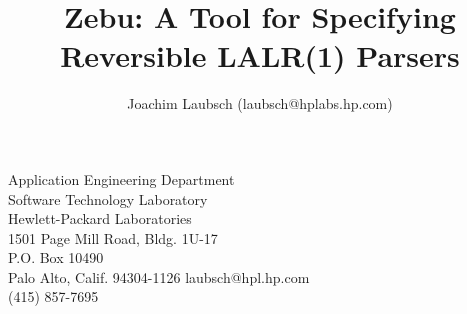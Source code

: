 %


\makeindex


\newcommand{\alt}[0]{$\dot{|}\: $}
\newcommand{\metavar}[1]{\mbox{$\langle\/$#1$\/\rangle$}}
\newcommand{\metavm}[1]{\mbox{\em $\langle\/$#1$\/\rangle$}}

\topmargin 0in
\textheight 8.5in
\oddsidemargin 0.2in
\evensidemargin 0.2in
\textwidth 6.0in
\parskip 0.2cm   


\title{{\sf Zebu}: A Tool for Specifying Reversible LALR(1) Parsers \\
  }
\author{Joachim Laubsch (laubsch@hplabs.hp.com)}    
\maketitle

\vspace{3in} 
\begin{flushright}
Application Engineering Department\\
Software Technology Laboratory\\
Hewlett-Packard Laboratories\\
1501 Page Mill Road, Bldg. 1U-17\\
P.O. Box 10490\\
Palo Alto, Calif. 94304-1126
\vspace{0.2in}
laubsch@hpl.hp.com\\
(415) 857-7695
\end{flushright}
\newpage
\newpage
\tableofcontents{}

